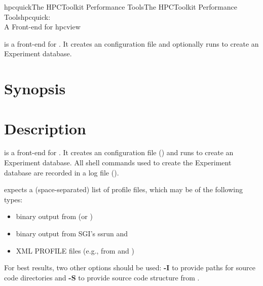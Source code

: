 \documentclass[english]{article}
\begin{document}
\begin{Name}{1}{hpcquick}{The HPCToolkit Performance Tools}{The HPCToolkit Performance Tools}{hpcquick:\\ A Front-end for hpcview}

 is a front-end for .
It creates an  configuration file and optionally runs  to create an Experiment database.

\end{Name}

\section{Synopsis}

 

\section{Description}

 is a front-end for .
It creates an  configuration file () and runs  to create an Experiment database.
All shell commands used to create the Experiment database are recorded in a log file ().

 expects a (space-separated) list of profile files, which may be of the following types:
\begin{itemize}
  \item binary output from  (or )
  \item binary output from SGI's ssrun and 
  \item XML PROFILE files (e.g., from  and )
\end{itemize}
For best results, two other options should be used: \textbf{-I} to provide paths for source code directories and \textbf{-S} to provide source code structure from .

\end{document}
